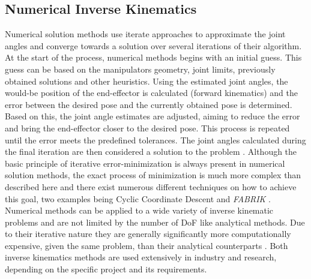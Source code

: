 \subsection{Numerical Inverse Kinematics}
Numerical solution methods use iterate approaches to approximate the joint angles and converge towards a solution over several iterations of their algorithm.
At the start of the process, numerical methods begins with an initial guess.
This guess can be based on the manipulators geometry, joint limits, previously obtained solutions and other heuristics.
Using the estimated joint angles, the would-be position of the end-effector is calculated (forward kinematics) and the error between the desired pose and the currently obtained pose is determined.
Based on this, the joint angle estimates are adjusted, aiming to reduce the error and bring the end-effector closer to the desired pose.
This process is repeated until the error meets the predefined tolerances.
The joint angles calculated during the final iteration are then considered a solution to the problem \parencite{inverseKinematicsIllinois}.
Although the basic principle of iterative error-minimization is always present in numerical solution methods, the exact process of minimization is much more complex than described here and there exist numerous different techniques on how to achieve this goal, two examples being Cyclic Coordinate Descent \parencite{inverseKinematicsIllinois} and \textit{FABRIK} \parencite{AristidouFABRIK}. 
Numerical methods can be applied to a wide variety of inverse kinematic problems and are not limited by the number of DoF like analytical methods.
Due to their iterative nature they are generally significantly more computationally expensive, given the same problem, than their analytical counterparts \parencite{aristidou2018inverse}.
Both inverse kinematics methods are used extensively in industry and research, depending on the specific project and its requirements.


